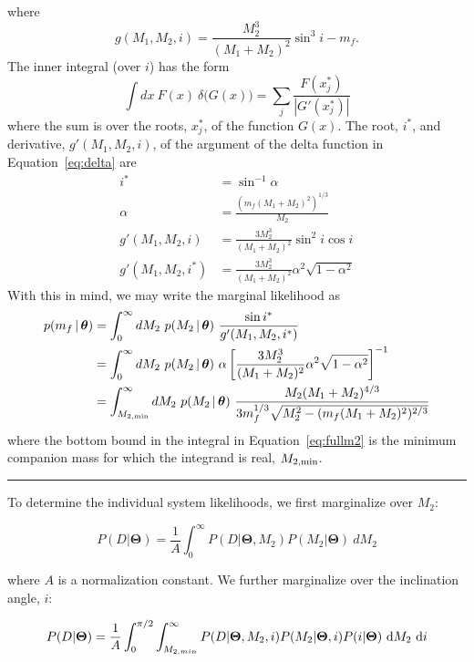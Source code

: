 \documentclass[letterpaper,12pt,preprint]{aastex}
\newcommand{\given}{\,|\,}
\newcommand{\bs}[1]{\boldsymbol{#1}}
\begin{document}
where
\begin{equation}
	g(M_1,M_2,i) = \frac{M_2^3}{(M_1+M_2)^2}\sin^3 i - m_f.
\end{equation}
The inner integral (over $i$) has the form
\begin{equation}
    \int dx~F(x)~\delta{(G(x)}) = \sum_j \frac{F(x^*_j)}{|G'(x^*_j)|}
\end{equation}
where the sum is over the roots, $x^*_j$, of the function $G(x)$. The root, $i^*$, and derivative, $g'(M_1,M_2,i)$, of the argument of the delta function in Equation~\ref{eq:delta} are 
\begin{align}
	i^* &= \sin^{-1}\alpha\\
	\alpha &= \frac{(m_f(M_1+M_2)^2)^{1/3}}{M_2}\\
	g'(M_1,M_2,i) &= \frac{3M_2^3}{(M_1+M_2)^2}\sin^2 i \cos i\\
	g'(M_1,M_2,i^*) &= \frac{3M_2^3}{(M_1+M_2)^2} \alpha^2 \sqrt{1 - \alpha^2}
\end{align}
With this in mind, we may write the marginal likelihood as
\begin{align}
	p(m_f \given \bs{\theta}) &= \int_{0}^\infty dM_2~p(M_2 \given \bs{\theta})~\frac{\sin i^*}{g'(M_1,M_2,i^*)}\\
	&= \int_{0}^\infty dM_2~p(M_2 \given \bs{\theta})~\alpha\left[\frac{3M_2^3}{(M_1+M_2)^2} \alpha^2 \sqrt{1 - \alpha^2}\right]^{-1}\\
	&= \int_{M_{2,{\rm min}}}^\infty dM_2~p(M_2 \given \bs{\theta})~\frac{M_2(M_1+M_2)^{4/3}}{3m_f^{1/3}\sqrt{M_2^2 - (m_f(M_1+M_2)^2)^{2/3}}}\label{eq:fullm2}
\end{align}
where the bottom bound in the integral in Equation~\ref{eq:fullm2} is the minimum companion mass for which the integrand is real, $M_{2,{\rm min}}$.

\vspace{2em}
\hrule

To determine the individual system likelihoods, we first marginalize over $M_2$:

\begin{equation}
P(D|\mathbf{\Theta}) = \frac{1}{A} \int_0^{\infty} P(D |\mathbf{\Theta}, M_2) P(M_2|\mathbf{\Theta})\ dM_2 
\end{equation}

where $A$ is a normalization constant. We further marginalize over the inclination angle, $i$:

\begin{equation}
P(D|\mathbf{\Theta}) = \frac{1}{A} \int_0^{\pi/2} \int_{M_{2,min}}^{\infty} P(D | \mathbf{\Theta}, M_2, i) P(M_2|\mathbf{\Theta}, i) P(i | \mathbf{\Theta})\ {\rm d}M_2\ {\rm d}i
\end{equation}
\end{document}
